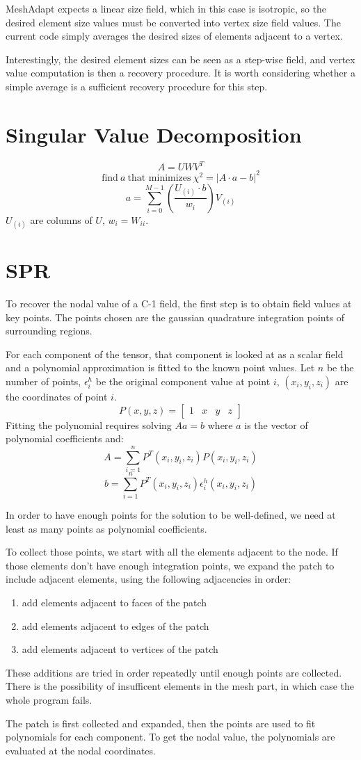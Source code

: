 \documentclass{article}
\begin{document}
MeshAdapt expects a linear size field, which in this
case is isotropic, so the desired element size values
must be converted into vertex size field values.
The current code simply averages the desired sizes
of elements adjacent to a vertex.

Interestingly, the desired element sizes can be seen
as a step-wise field, and vertex value computation
is then a recovery procedure.
It is worth considering whether a simple average
is a sufficient recovery procedure for this step.

\appendix
\section{Singular Value Decomposition}
\[A=UWV^T\]
\[\text{find}\ a\ \text{that minimizes}\ \chi^2=|A\cdot a-b|^2\]
\[a = \sum_{i=0}^{M-1}\left(\frac{U_{(i)}\cdot b}{w_i}\right)V_{(i)}\]
$U_{(i)}$ are columns of $U$, $w_i=W_{ii}$.

\section{SPR}

To recover the nodal value of a C-1 field, the first
step is to obtain field values at key points.
The points chosen are the gaussian quadrature integration
points of surrounding regions.

For each component of the tensor, that component is looked
at as a scalar field and a polynomial approximation is
fitted to the known point values.
Let $n$ be the number of points, $\epsilon_i^h$ be the
original component value at point $i$, $(x_i,y_i,z_i)$
are the coordinates of point $i$.
\[P(x,y,z)=
\begin{bmatrix}
1 & x & y & z
\end{bmatrix}
\]
Fitting the polynomial requires solving $Aa=b$ where $a$
is the vector of polynomial coefficients and:
\[A=\sum_{i=1}^nP^T(x_i,y_i,z_i)P(x_i,y_i,z_i)\]
\[b=\sum_{i=1}^nP^T(x_i,y_i,z_i)\epsilon_i^h(x_i,y_i,z_i)\]

In order to have enough points for the solution to be
well-defined, we need at least as many points as
polynomial coefficients.

To collect those points, we start with all the elements
adjacent to the node.
If those elements don't have enough integration points,
we expand the patch to include adjacent elements, using
the following adjacencies in order:
\begin{enumerate}
\item add elements adjacent to faces of the patch
\item add elements adjacent to edges of the patch
\item add elements adjacent to vertices of the patch
\end{enumerate}
These additions are tried in order repeatedly until
enough points are collected.
There is the possibility of insufficent elements
in the mesh part, in which case the whole program fails.

The patch is first collected and expanded, then the points
are used to fit polynomials for each component.
To get the nodal value, the polynomials are evaluated
at the nodal coordinates.
\end{document}
